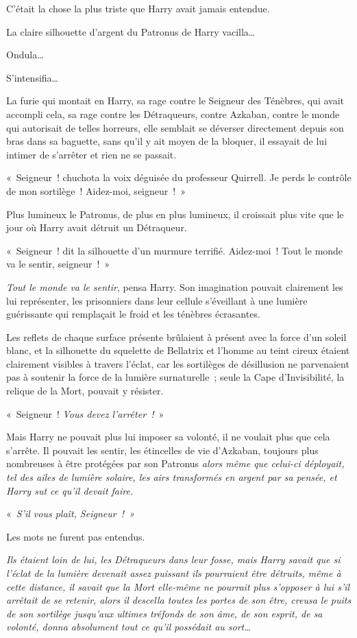 C'était la chose la plus triste que Harry avait jamais entendue.

La claire silhouette d'argent du Patronus de Harry vacilla…

Ondula…

S'intensifia…

La furie qui montait en Harry, sa rage contre le Seigneur des Ténèbres, qui avait accompli cela, sa rage contre les Détraqueurs, contre Azkaban, contre le monde qui autorisait de telles horreurs, elle semblait se déverser directement depuis son bras dans sa baguette, sans qu'il y ait moyen de la bloquer, il essayait de lui intimer de s'arrêter et rien ne se passait.

«~Seigneur~! chuchota la voix déguisée du professeur Quirrell. Je perds le contrôle de mon sortilège~! Aidez-moi, seigneur~!~»

Plus lumineux le Patronus, de plus en plus lumineux, il croissait plus vite que le jour où Harry avait détruit un Détraqueur.

«~Seigneur~! dit la silhouette d'un murmure terrifié. Aidez-moi~! Tout le monde va le sentir, seigneur~!~»

\emph{Tout le monde va le sentir}, pensa Harry. Son imagination pouvait clairement les lui représenter, les prisonniers dans leur cellule s'éveillant à une lumière guérissante qui remplaçait le froid et les ténèbres écrasantes.

Les reflets de chaque surface présente brûlaient à présent avec la force d'un soleil blanc, et la silhouette du squelette de Bellatrix et l'homme au teint cireux étaient clairement visibles à travers l'éclat, car les sortilèges de désillusion ne parvenaient pas à soutenir la force de la lumière surnaturelle~; seule la Cape d'Invisibilité, la relique de la Mort, pouvait y résister.

«~Seigneur~! \emph{Vous devez l'arrêter~!}~»

Mais Harry ne pouvait plus lui imposer sa volonté, il ne voulait plus que cela s'arrête. Il pouvait les sentir, les étincelles de vie d'Azkaban, toujours plus nombreuses à être protégées par son Patronus \emph{alors même que celui-ci déployait, tel des ailes de lumière solaire, les airs transformés en argent par sa pensée, et Harry sut ce qu'il devait faire.}

«~\emph{S'il vous plaît, Seigneur~!~»}

Les mots ne furent pas entendus.

\emph{Ils étaient loin de lui, les Détraqueurs dans leur fosse, mais Harry savait que si l'éclat de la lumière devenait assez puissant ils pourraient être détruits, même à cette distance, il savait que la Mort elle-même ne pourrait plus s'opposer à lui s'il arrêtait de se retenir, alors il descella toutes les portes de son être, creusa le puits de son sortilège jusqu'aux ultimes tréfonds de son âme, de son esprit, de sa volonté, donna absolument tout ce qu'il possédait au sort…}

